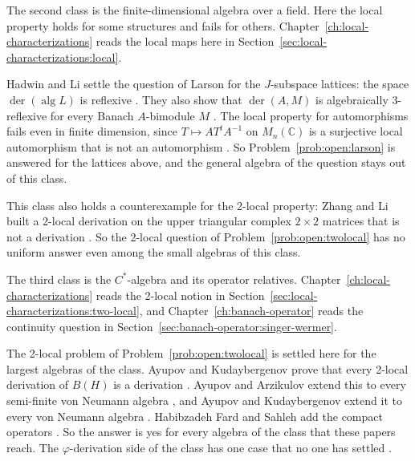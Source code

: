 The second class is the finite-dimensional algebra over a field.
Here the local property holds for some structures and fails for others.
Chapter~\ref{ch:local-characterizations} reads the local maps here in
Section~\ref{sec:local-characterizations:local}. %

Hadwin and Li settle the question of Larson for the $J$-subspace lattices: the
space $\operatorname{der}(\operatorname{alg}L)$ is reflexive
\cite[Theorem~2.15, p.~708]{HadwinLi2004}.
They also show that $\operatorname{der}(A,M)$ is algebraically $3$-reflexive for
every Banach $A$-bimodule $M$ \cite[Theorem~2.19, p.~710]{HadwinLi2004}.
The local property for automorphisms fails even in finite dimension, since
$T\mapsto AT^{t}A^{-1}$ on $M_n(\mathbb{C})$ is a surjective local automorphism
that is not an automorphism \cite[p.~713]{HadwinLi2004}.
So Problem~\ref{prob:open:larson} is answered for the lattices above, and the
general algebra of the question stays out of this class.

This class also holds a counterexample for the 2-local property: Zhang and Li
built a 2-local derivation on the upper triangular complex $2\times2$ matrices
that is not a derivation \cite[p.~15]{AyupovKudaybergenov2012}.
So the 2-local question of Problem~\ref{prob:open:twolocal} has no uniform answer
even among the small algebras of this class.

The third class is the $C^{*}$-algebra and its operator relatives.
Chapter~\ref{ch:local-characterizations} reads the 2-local notion in
Section~\ref{sec:local-characterizations:two-local}, and
Chapter~\ref{ch:banach-operator} reads the continuity question in
Section~\ref{sec:banach-operator:singer-wermer}. %

The 2-local problem of Problem~\ref{prob:open:twolocal} is settled here for the
largest algebras of the class.
Ayupov and Kudaybergenov prove that every 2-local derivation of $B(H)$ is a
derivation \cite[Theorem~2.3, p.~16]{AyupovKudaybergenov2012}.
Ayupov and Arzikulov extend this to every semi-finite von Neumann algebra
\cite[p.~9]{AyupovArzikulov2014}, and Ayupov and Kudaybergenov extend it to
every von Neumann algebra \cite[Theorem~2.1, p.~2]{AyupovKudaybergenov2015}.
Habibzadeh Fard and Sahleh add the compact operators
\cite[Corollary~3.4, p.~6]{HabibzadehFardSahleh2019}.
So the answer is yes for every algebra of the class that these papers reach.
The $\varphi$-derivation side of the class has one case that no one has settled
\cite[Remark~5.3, p.~720]{BresarVillena2002}.

